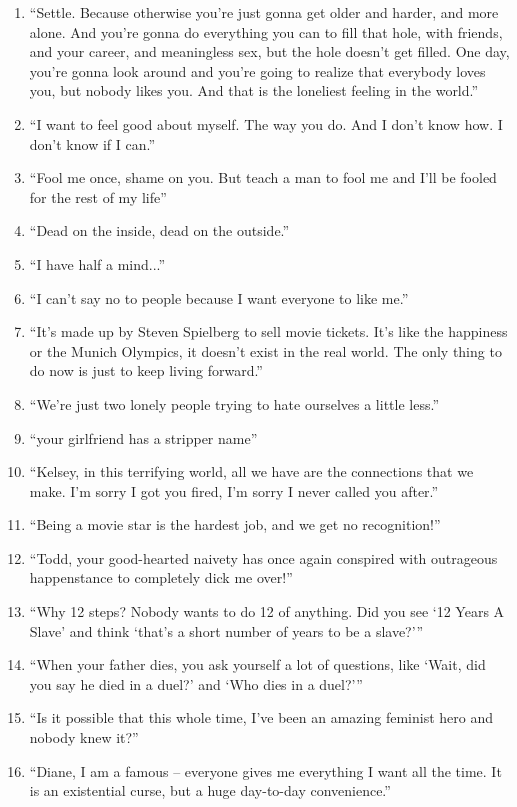 \documentclass{book}
\numberwithin{equation}{section}
\begin{document}
\begin{enumerate}
    \item ``Settle. Because otherwise you're just gonna get older and harder, and more alone. And you're gonna do everything you can to fill that hole, with friends, and your career, and meaningless sex, but the hole doesn't get filled. One day, you're gonna look around and you're going to realize that everybody loves you, but nobody likes you. And that is the loneliest feeling in the world.''
    \item ``I want to feel good about myself. The way you do. And I don't know how. I don't know if I can.''
    \item ``Fool me once, shame on you. But teach a man to fool me and I'll be fooled for the rest of my life'' 
    \item ``Dead on the inside, dead on the outside.''
    \item ``I have half a mind...''
    \item ``I can't say no to people because I want everyone to like me.''
    \item ``It's made up by Steven Spielberg to sell movie tickets. It's like the happiness or the Munich Olympics, it doesn't exist in the real world. The only thing to do now is just to keep living forward.''
    \item ``We're just two lonely people trying to hate ourselves a little less.''
    \item ``your girlfriend has a stripper name''
    \item ``Kelsey, in this terrifying world, all we have are the connections that we make. I'm sorry I got you fired, I'm sorry I never called you after.''
    \item ``Being a movie star is the hardest job, and we get no recognition!''
    \item ``Todd, your good-hearted naivety has once again conspired with outrageous happenstance to completely dick me over!''
    \item ``Why 12 steps? Nobody wants to do 12 of anything. Did you see `12 Years A Slave' and think `that's a short number of years to be a slave?'''
    \item ``When your father dies, you ask yourself a lot of questions, like `Wait, did you say he died in a duel?' and `Who dies in a duel?'''
    \item ``Is it possible that this whole time, I've been an amazing feminist hero and nobody knew it?''
    \item ``Diane, I am a famous -- everyone gives me everything I want all the time. It is an existential curse, but a huge day-to-day convenience.''

\end{enumerate}
\end{document}
